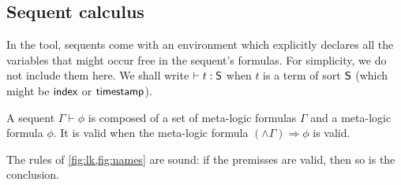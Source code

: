 \subsection{Sequent calculus}

In the tool, sequents come with an environment which explicitly
declares all the variables that might occur free in the sequent's formulas.
For simplicity, we do not include them here. We shall write $\vdash t:\textsf{S}$
when $t$ is a term of sort $\textsf{S}$ (which might be $\textsf{index}$ or $\textsf{timestamp}$).

\begin{definition}
  A sequent $\Gamma \vdash \phi$ is composed of a set of meta-logic formulas
  $\Gamma$ and a meta-logic formula $\phi$.
  It is valid when the meta-logic formula
  $(\wedge\Gamma) \Rightarrow \phi$ is valid.
\end{definition}

\begin{proposition}
  The rules of \cref{fig:lk,fig:names} are sound: if the premisses are valid,
  then so is the conclusion.
\end{proposition}

